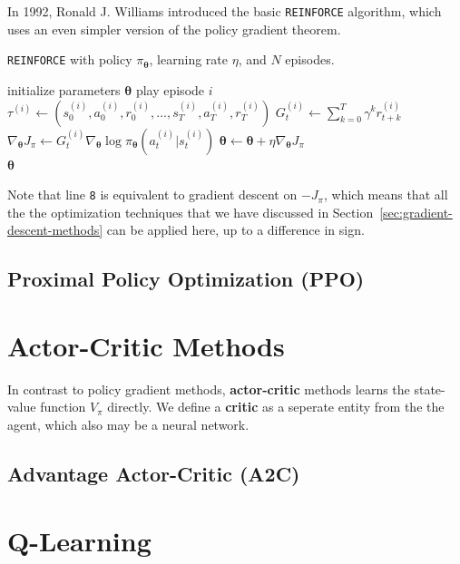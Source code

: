 \documentclass[12pt]{report}
\theoremstyle{definition}
\theoremstyle{remark}
\begin{document}
In 1992, Ronald J. Williams introduced the basic \texttt{REINFORCE} algorithm, which uses an even simpler version of the policy gradient theorem.~\cite{williams_simple_1992}
\begin{algorithm}
    \caption{\texttt{REINFORCE} with policy $\pi_{\boldsymbol{\theta}}$, learning rate $\eta$, and $N$ episodes.}\label{alg:REINFORCE}
    \begin{algorithmic}[1]
        \State initialize parameters $\boldsymbol{\theta}$
            \State play episode $i$
            \State $\tau^{(i)} \leftarrow (s_0^{(i)}, a_0^{(i)}, r_0^{(i)}, \ldots, s_T^{(i)}, a_T^{(i)}, r_T^{(i)})$
                \State $G_t^{(i)} \leftarrow \sum_{k=0}^{T} \gamma^k r_{t+k}^{(i)}$
                \State $\nabla_{\boldsymbol{\theta}} J_\pi \leftarrow G_t^{(i)} \nabla_{\boldsymbol{\theta}} \log \pi_{\boldsymbol{\theta}}(a_t^{(i)} | s_t^{(i)})$
                \State $\boldsymbol{\theta} \leftarrow \boldsymbol{\theta} + \eta \nabla_{\boldsymbol{\theta}} J_\pi$
            \EndFor
        \EndFor \\
        \Return $\boldsymbol{\theta}$
    \end{algorithmic}
\end{algorithm}
Note that line \texttt{8} is equivalent to gradient descent on $-J_\pi$, which means that all the the optimization techniques that we have discussed in Section~\ref{sec:gradient-descent-methods} can be applied here, up to a difference in sign.


\subsection{Proximal Policy Optimization (PPO)}
\cite{schulman_proximal_2017}

\section{Actor-Critic Methods}
In contrast to policy gradient methods, \textbf{actor-critic} methods learns the state-value function $V_\pi$ directly. We define a \textbf{critic} as a seperate entity from the the agent, which also may be a neural network.

\subsection{Advantage Actor-Critic (A2C)}

\section{Q-Learning}
\end{document}
